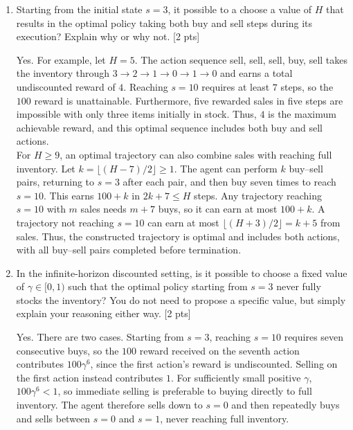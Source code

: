 \documentclass[11pt]{article}
\begin{document}
\begin{enumerate}[label=(\alph*)]
    \item Starting from the initial state $s = 3$, it possible to a choose a value of $H$ that results in the optimal policy taking both buy and sell steps during its execution? Explain why or why not. [2 pts]

    \begin{tcolorbox}[breakable]
Yes. For example, let $H=5$. The action sequence
sell, sell, sell, buy, sell takes the inventory through
$3 \to 2 \to 1 \to 0 \to 1 \to 0$ and earns a total undiscounted reward of $4$.
Reaching $s=10$ requires at least $7$ steps, so the $100$ reward
is unattainable. Furthermore, five rewarded sales in five steps
are impossible with only three items initially in stock.
Thus, $4$ is the maximum achievable reward, and this optimal
sequence includes both buy and sell actions.\\

\noindent For $H\geq9$, an optimal trajectory can also combine sales with
reaching full inventory. Let $k=\lfloor(H-7)/2\rfloor\geq1$.
The agent can perform $k$ buy--sell pairs, returning to $s=3$
after each pair, and then buy seven times to reach $s=10$.
This earns $100+k$ in $2k+7\leq H$ steps.
Any trajectory reaching $s=10$ with $m$ sales needs $m+7$ buys,
so it can earn at most $100+k$. A trajectory not reaching $s=10$
can earn at most $\lfloor(H+3)/2\rfloor=k+5$ from sales.
Thus, the constructed trajectory is optimal and includes both
actions, with all buy--sell pairs completed before termination.
    \end{tcolorbox}
    \newpage

    \item In the infinite-horizon discounted setting, is it possible to choose a fixed value of $\gamma \in [0, 1)$ such that the optimal policy starting from $s = 3$ never fully stocks the inventory? You do not need to propose a specific value, but simply explain your reasoning either way. [2 pts]
    \begin{tcolorbox}[breakable]
Yes. There are two cases.
Starting from $s=3$, reaching $s=10$ requires seven consecutive buys,
so the $100$ reward received on the seventh action contributes
$100\gamma^6$, since the first action's reward is undiscounted.
Selling on the first action instead contributes $1$.
For sufficiently small positive $\gamma$,
$100\gamma^6<1$, so immediate selling is preferable to
buying directly to full inventory.
The agent therefore sells down to $s=0$ and then repeatedly buys
and sells between $s=0$ and $s=1$, never reaching full inventory.\\


\end{tcolorbox}
\end{enumerate}
\end{document}
